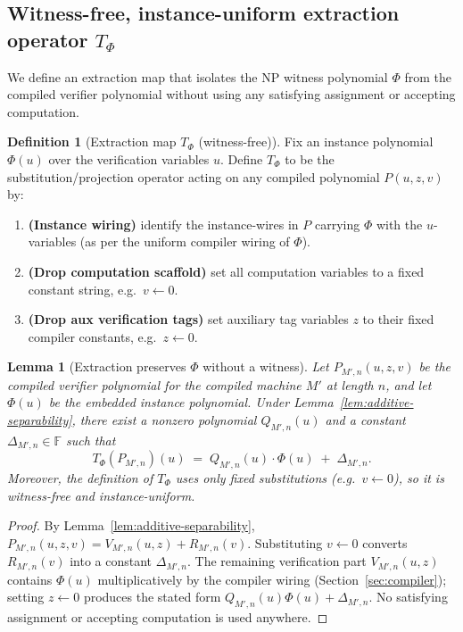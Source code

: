 \documentclass[12pt]{article}
\newtheorem{lemma}[theorem]{Lemma}
\theoremstyle{definition}
\newtheorem{definition}{Definition}
\theoremstyle{definition}
\theoremstyle{remark}
\theoremstyle{remark}
\begin{document}
\subsection{Witness-free, instance-uniform extraction operator $T_{\Phi}$}
\label{subsec:witness-free-extraction}

We define an extraction map that isolates the NP witness polynomial $\Phi$
from the compiled verifier polynomial without using any satisfying assignment
or accepting computation.

\begin{definition}[Extraction map $T_{\Phi}$ (witness-free)]
\label{def:extraction-map-wf}
Fix an instance polynomial $\Phi(u)$ over the verification variables $u$.
Define $T_{\Phi}$ to be the substitution/projection operator acting on any
compiled polynomial $P(u,z,v)$ by:
\begin{enumerate}
\item \textbf{(Instance wiring)} identify the instance-wires in $P$ carrying $\Phi$
      with the $u$-variables (as per the uniform compiler wiring of $\Phi$).
\item \textbf{(Drop computation scaffold)} set all computation variables to a fixed
      constant string, e.g.\ $v\leftarrow 0$.
\item \textbf{(Drop aux verification tags)} set auxiliary tag variables $z$ to their
      fixed compiler constants, e.g.\ $z\leftarrow 0$.
\end{enumerate}
\end{definition}

\begin{lemma}[Extraction preserves $\Phi$ without a witness]
\label{lem:extraction-no-witness}
Let $P_{M',n}(u,z,v)$ be the compiled verifier polynomial for the compiled machine $M'$
at length $n$, and let $\Phi(u)$ be the embedded instance polynomial. Under
Lemma~\ref{lem:additive-separability}, there exist a nonzero polynomial $Q_{M',n}(u)$
and a constant $\Delta_{M',n}\in\mathbb{F}$ such that
\[
T_{\Phi}\!\left(P_{M',n}\right)(u) \;=\; Q_{M',n}(u)\cdot \Phi(u) \;+\; \Delta_{M',n}.
\]
Moreover, the definition of $T_{\Phi}$ uses only fixed substitutions (e.g.\ $v\leftarrow 0$),
so it is witness-free and instance-uniform.
\end{lemma}

\begin{proof}
By Lemma~\ref{lem:additive-separability}, $P_{M',n}(u,z,v)=V_{M',n}(u,z)+R_{M',n}(v)$.
Substituting $v\leftarrow 0$ converts $R_{M',n}(v)$ into a constant $\Delta_{M',n}$.
The remaining verification part $V_{M',n}(u,z)$ contains $\Phi(u)$ multiplicatively by
the compiler wiring (Section~\ref{sec:compiler}); setting $z\leftarrow 0$
produces the stated form $Q_{M',n}(u)\Phi(u)+\Delta_{M',n}$.
No satisfying assignment or accepting computation is used anywhere.
\end{proof}
\end{document}

